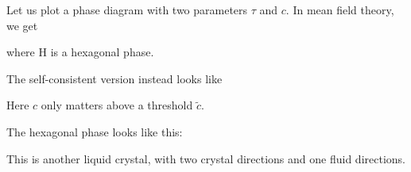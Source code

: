 \documentclass[a4paper]{article}
\begin{document}
Let us plot a phase diagram with two parameters $\tau$ and $c$. In mean field theory, we get


where H is a hexagonal phase.

The self-consistent version instead looks like

Here $c$ only matters above a threshold $\tilde{c}$.

The hexagonal phase looks like this:


This is another liquid crystal, with two crystal directions and one fluid directions.

\printindex
\end{document}
